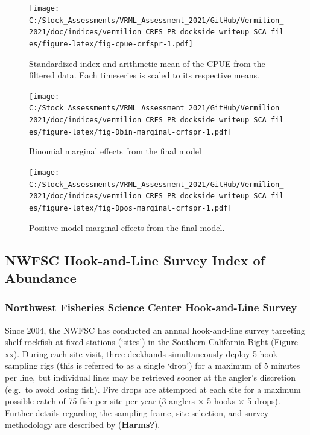 \documentclass[
  english,
  a4paper,
]{article}
\begin{document}
\begin{figure}
\centering
\texttt{[image: C:/Stock\_Assessments/VRML\_Assessment\_2021/GitHub/Vermilion\_2021/doc/indices/vermilion\_CRFS\_PR\_dockside\_writeup\_SCA\_files/figure-latex/fig-cpue-crfspr-1.pdf]}
\caption{\label{fig:fig-cpue-crfspr}Standardized index and arithmetic mean of the CPUE from the filtered data. Each timeseries is scaled to its respective means.}
\end{figure}

\begin{figure}
\centering
\texttt{[image: C:/Stock\_Assessments/VRML\_Assessment\_2021/GitHub/Vermilion\_2021/doc/indices/vermilion\_CRFS\_PR\_dockside\_writeup\_SCA\_files/figure-latex/fig-Dbin-marginal-crfspr-1.pdf]}
\caption{\label{fig:fig-Dbin-marginal-crfspr}Binomial marginal effects from the final model}
\end{figure}

\begin{figure}
\centering
\texttt{[image: C:/Stock\_Assessments/VRML\_Assessment\_2021/GitHub/Vermilion\_2021/doc/indices/vermilion\_CRFS\_PR\_dockside\_writeup\_SCA\_files/figure-latex/fig-Dpos-marginal-crfspr-1.pdf]}
\caption{\label{fig:fig-Dpos-marginal-crfspr}Positive model marginal effects from the final model.}
\end{figure}

\clearpage

\hypertarget{nwfschl-index}{%
\subsection{NWFSC Hook-and-Line Survey Index of Abundance}\label{nwfschl-index}}

\hypertarget{northwest-fisheries-science-center-hook-and-line-survey}{%
\subsubsection{Northwest Fisheries Science Center Hook-and-Line Survey}\label{northwest-fisheries-science-center-hook-and-line-survey}}

Since 2004, the NWFSC has conducted an annual hook-and-line survey targeting shelf rockfish at fixed stations (`sites') in the Southern California Bight (Figure xx). During each site visit, three deckhands simultaneously deploy 5-hook sampling rigs (this is referred to as a single `drop') for a maximum of 5 minutes per line, but individual lines may be retrieved sooner at the angler's discretion (e.g.~to avoid losing fish). Five drops are attempted at each site for a maximum possible catch of 75 fish per site per year (3 anglers × 5 hooks × 5 drops). Further details regarding the sampling frame, site selection, and survey methodology are described by (\textbf{Harms?}).
\end{document}
